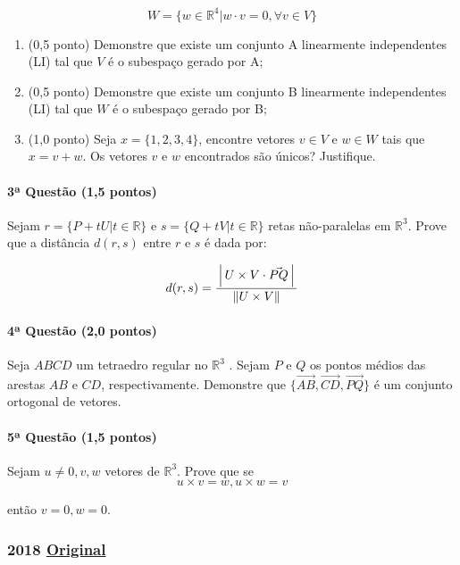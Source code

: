 \documentclass[12pt,a4paper]{article}
\newcommand{\R}{\mathbb{R}}
\newcommand{\original}[1]{\tiny \href{#1}{Original} \normalsize}
\begin{document}
$$ W = \{ w \in \R^4 | w \cdot v = 0 , \forall v \in V   \} $$

\begin{enumerate}[label=\alph*)]
    \item (0,5 ponto) Demonstre que existe um conjunto A linearmente independentes (LI) tal que $V$ é o subespaço gerado por A;
    \item (0,5 ponto) Demonstre que existe um conjunto B linearmente independentes (LI) tal que $W$ é o subespaço gerado por B;
    \item (1,0 ponto) Seja $x = \{ 1,2,3,4 \}$, encontre vetores $v \in V$ e $w \in W$ tais que $ x = v + w$. Os vetores $v$ e $w$ encontrados são únicos? Justifique.
\end{enumerate}

\paragraph{3ª Questão (1,5 pontos)}

Sejam $r = \{P + tU | t \in \mathbb{R}\}$ e $s = \{Q + tV | t \in \mathbb{R}\}$ retas não-paralelas em $\R^3$. Prove que a distância $d(r, s)$ entre $r$ e $s$ é dada por:

$$ d(r,s) = \dfrac{\left\arrowvert U \times V \cdot \vec{PQ} \right\arrowvert}{\Arrowvert U \times V \Arrowvert} $$ 

\paragraph{4ª Questão (2,0 pontos)}

Seja $ABCD$ um tetraedro regular no $\R^3$ . Sejam $P$ e $Q$ os pontos médios das arestas $AB$ e $CD$, respectivamente. Demonstre que $\{ \overrightarrow{AB}, \overrightarrow{CD}, \overrightarrow{PQ} \}$ é um conjunto ortogonal de vetores.
 
\paragraph{5ª Questão (1,5 pontos)}

Sejam $u \neq 0, v, w$ vetores de $\R^3$. Prove que se 
$$ u \times v = w , u \times w = v
$$

então $v = 0, w = 0$.

\newpage


\subsubsection{2018 \original{https://drive.google.com/drive/folders/1XPn5NW2-31TxGcEpJcxMoFLFpvSTCHtt}}
\end{document}
